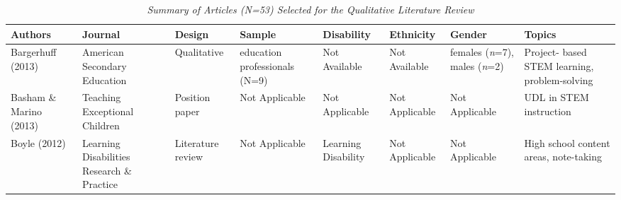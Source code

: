 \documentclass[11.5pt]{sig-alternate}
\begin{document}
\clearpage

\begin{@twocolumnfalse}
\RaggedRight
\begin{table}
\caption{\textit{Summary of Articles (N=53) Selected for the Qualitative Literature Review}}
\label{tab:my-table}
\begin{tabular}{m{0.72in}m{0.72in}m{0.72in}m{0.72in}m{0.72in}m{0.72in}m{0.72in}m{0.72in}}
\hline
Authors                                                 & Journal                                                         & Design                                & Sample                                                                                       & Disability                                        & Ethnicity                                                                                              & Gender                                                           & Topics                                                                                                   \\ \hline
Bargerhuff (2013)                                       & American Secondary Education                                    & Qualitative                           & education professionals (N=9)                                                                & \centering  \centering Not Available                                    &  \centering Not Available                                                                                          & females (\textit{n}=7), males (\textit{n}=2)                                       & Project- based STEM learning, problem-solving                                                            \\ \hline
Basham \& Marino (2013)                                 & Teaching Exceptional Children                                   & Position paper                        &  \centering Not Applicable                                                                               &  \centering Not Applicable                                    &  \centering Not Applicable                                                                                         &  \centering Not Applicable                                                   & UDL in STEM instruction                                                                                  \\ \hline
Boyle (2012)                                            & Learning Disabilities Research \& Practice                      & Literature review                     &  \centering Not Applicable                                                                               & Learning Disability                               &  \centering Not Applicable                                                                                         &  \centering Not Applicable                                                   & High school content areas, note-taking                                                                   \\ \hline

\end{tabular}
\end{table}
\end{@twocolumnfalse}
\end{document}
